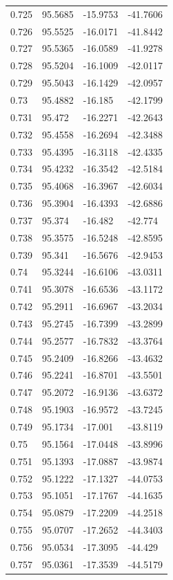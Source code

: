 \begin{tabular}{llll}
0.725 & 95.5685 & -15.9753 & -41.7606 \\
0.726 & 95.5525 & -16.0171 & -41.8442 \\
0.727 & 95.5365 & -16.0589 & -41.9278 \\
0.728 & 95.5204 & -16.1009 & -42.0117 \\
0.729 & 95.5043 & -16.1429 & -42.0957 \\
0.73 & 95.4882 & -16.185 & -42.1799 \\
0.731 & 95.472 & -16.2271 & -42.2643 \\
0.732 & 95.4558 & -16.2694 & -42.3488 \\
0.733 & 95.4395 & -16.3118 & -42.4335 \\
0.734 & 95.4232 & -16.3542 & -42.5184 \\
0.735 & 95.4068 & -16.3967 & -42.6034 \\
0.736 & 95.3904 & -16.4393 & -42.6886 \\
0.737 & 95.374 & -16.482 & -42.774 \\
0.738 & 95.3575 & -16.5248 & -42.8595 \\
0.739 & 95.341 & -16.5676 & -42.9453 \\
0.74 & 95.3244 & -16.6106 & -43.0311 \\
0.741 & 95.3078 & -16.6536 & -43.1172 \\
0.742 & 95.2911 & -16.6967 & -43.2034 \\
0.743 & 95.2745 & -16.7399 & -43.2899 \\
0.744 & 95.2577 & -16.7832 & -43.3764 \\
0.745 & 95.2409 & -16.8266 & -43.4632 \\
0.746 & 95.2241 & -16.8701 & -43.5501 \\
0.747 & 95.2072 & -16.9136 & -43.6372 \\
0.748 & 95.1903 & -16.9572 & -43.7245 \\
0.749 & 95.1734 & -17.001 & -43.8119 \\
0.75 & 95.1564 & -17.0448 & -43.8996 \\
0.751 & 95.1393 & -17.0887 & -43.9874 \\
0.752 & 95.1222 & -17.1327 & -44.0753 \\
0.753 & 95.1051 & -17.1767 & -44.1635 \\
0.754 & 95.0879 & -17.2209 & -44.2518 \\
0.755 & 95.0707 & -17.2652 & -44.3403 \\
0.756 & 95.0534 & -17.3095 & -44.429 \\
0.757 & 95.0361 & -17.3539 & -44.5179 \\

\end{tabular}
